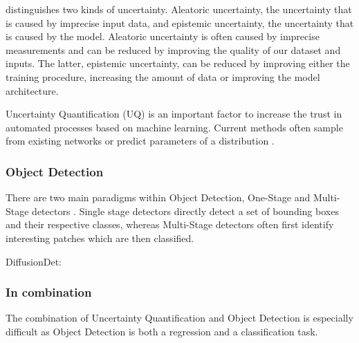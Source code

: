 \citep{gal2016uncertainty} distinguishes two kinds of uncertainty. Aleatoric uncertainty, the uncertainty that is caused by imprecise input data, and epistemic uncertainty, the uncertainty that is caused by the model. Aleatoric uncertainty is often caused by imprecise measurements and can be reduced by improving the quality of our dataset and inputs. The latter, epistemic uncertainty, can be reduced by improving either the training procedure, increasing the amount of data or improving the model architecture.

Uncertainty Quantification (UQ) is an important factor to increase the trust in automated processes based on machine learning. Current methods often sample from existing networks \cite{gal2016dropout,NEURIPS2019_118921ef,miller2019evaluating} or predict parameters of a distribution \cite{choi2019gaussian,swiatkowski2020ktied}.


\subsubsection{Object Detection}\label{sec:broadliterature:object_detection}

There are two main paradigms within Object Detection, One-Stage \cite{zhou2019objects, bochkovskiy2020yolov4, wang2022yolov7} and Multi-Stage detectors \cite{girshick2014rich, girshick2015fast}. Single stage detectors directly detect a set of bounding boxes and their respective classes, whereas Multi-Stage detectors often first identify interesting patches which are then classified.

DiffusionDet: \cite{chen2023diffusiondet}







\subsubsection{In combination}\label{sec:broadliterature:combination}
The combination of Uncertainty Quantification and Object Detection is especially difficult as Object Detection is both a regression and a classification task.

